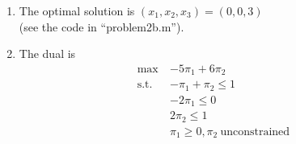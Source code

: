 \documentclass[12pt]{article}
\begin{document}
\begin{enumerate}
\begin{enumerate}
\begin{enumerate}
          \item
            The optimal solution is $(x_1,x_2,x_3)=(0,0,3)$\\
            (see the code in ``problem2b.m'').
          \item
            The dual is
            \begin{equation}
              \begin{split}
              \text{max}\ &-5\pi_1+6\pi_2\\
              \text{s.t.}\ &-\pi_1+\pi_2\leq 1\\
              &-2\pi_1\leq 0\\
              &2\pi_2\leq 1\\
              & \pi_1\geq 0, \pi_2\ \text{unconstrained}\\
              \end{split}
            \end{equation}


\end{enumerate}
\end{enumerate}
\end{enumerate}
\end{document}
